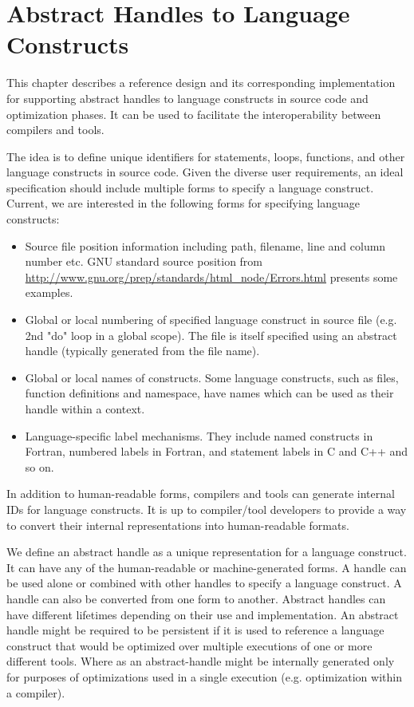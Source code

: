 \chapter{Abstract Handles to Language Constructs}
This chapter describes a reference design and its corresponding implementation for supporting abstract handles to language constructs in source code and optimization phases. 
It can be used to facilitate the interoperability between compilers and tools. 

The idea is to define unique identifiers for statements, loops, functions, 
and other language constructs in source code. Given the diverse user
requirements, an ideal specification should include multiple forms to specify a language construct. 
Current, we are interested in the following forms for specifying language constructs:
\begin{itemize}
\item Source file position information including path, filename, line and column number etc. 
GNU standard source position from
\url{http://www.gnu.org/prep/standards/html\_node/Errors.html} presents
some examples.  
\item Global or local numbering of specified language construct in source file
  (e.g. 2nd "do" loop in a global scope).  The file is itself specified using an abstract
          handle (typically generated from the file name). 
\item Global or local names of constructs. Some language constructs, such
as files, function definitions and namespace, have names which can be
used as their handle within a context.
\item Language-specific label mechanisms. They include named constructs in Fortran, numbered labels in Fortran, and statement labels in C and C++ and so on. 
\end{itemize}
In addition to human-readable forms, compilers and tools can generate
internal IDs for language constructs. It is up to compiler/tool developers
to provide a way to convert their internal representations into human-readable formats. 

We define an abstract handle as a unique representation for a language construct. It can have any of the human-readable or machine-generated forms. 
A handle can be used alone or combined with other handles to specify a language construct. 
A handle can also be converted from one form to another.
Abstract handles can have different lifetimes depending on their use and implementation. 
An abstract handle might be required to be persistent if it is used to reference a language construct that would be optimized over  multiple executions of one or more different tools. 
Where as an abstract-handle might be internally generated only for purposes of
           optimizations used in a single execution (e.g. optimization within a compiler). 

